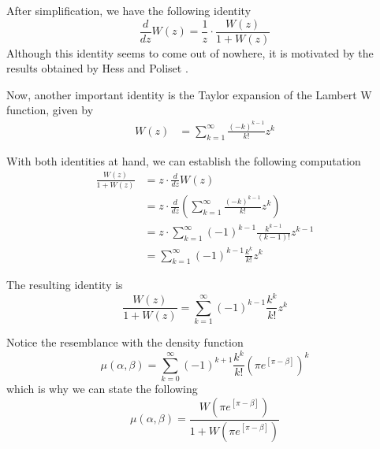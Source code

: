 \documentclass{article}
\newcommand{\ppar}[1]{\left( #1 \right)}
\newcommand{\spar}[1]{\left[ #1 \right]}
\begin{document}
After simplification, we have the following identity
\begin{equation}
    \frac{d}{dz} W(z) 
    =
    \frac{1}{z} \cdot \frac{W(z)}{1+W(z)}
\end{equation}
Although this identity seems to come out of nowhere, it is motivated by the results obtained by Hess and Poliset \cite{hess2023}.

Now, another important identity is the Taylor expansion of the Lambert W function, given by
\begin{align}
    W(z) 
    &=
    \sum_{k=1}^\infty 
    \frac{(-k)^{k-1}}{k!} z^k
\end{align}

With both identities at hand, we can establish the following computation
\begin{align*}
    \frac{W(z)}{1+W(z)}
    &=
    z \cdot \frac{d}{dz} W(z)
    \\
    &=
    z \cdot \frac{d}{dz} \ppar{\sum_{k=1}^\infty 
    \frac{(-k)^{k-1}}{k!} z^k}
    \\
    &=
    z \cdot {\sum_{k=1}^\infty 
    \ppar{-1}^{k-1}
    \frac{k^{k-1}}{\ppar{k-1}!} z^{k-1}}
    \\
    &=
    {\sum_{k=1}^\infty 
    \ppar{-1}^{k-1}
    \frac{k^{k}}{{k}!} z^{k}}
\end{align*}

The resulting identity is
\begin{equation}
    \frac{W(z)}{1+W(z)}
    =
    {\sum_{k=1}^\infty 
    \ppar{-1}^{k-1}
    \frac{k^{k}}{{k}!} z^{k}}
\end{equation}

Notice the resemblance with the density function
\begin{equation}
    \mu(\alpha, \beta) =
    \sum_{k=0}^{\infty}
    (-1)^{k+1} \frac{k^k}{k!} 
    \ppar{\pi e^{\spar{\pi-\beta}} }^k
\end{equation}
which is why we can state the following
\begin{equation}
    \mu(\alpha, \beta) =
    \frac{W\ppar{\pi e^{\spar{\pi-\beta}}}}{1+W\ppar{\pi e^{\spar{\pi-\beta}}}}
\end{equation}




\end{document}
